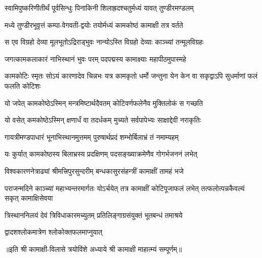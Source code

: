 

\twolineshloka
{स्वामिपुष्करिणीतीर्थं पूर्वसिन्धुः पिनाकिनी}
{शिलाह्रदश्चतुर्मध्यं यावत् तुण्डीरमण्डलम्}

\twolineshloka
{मध्ये तुण्डीरभूवृत्तं कम्पा-वेगवती-द्वयोः}
{तयोर्मध्यं कामकोष्ठं कामाक्षी तत्र वर्तते}

\twolineshloka
{स एव विग्रहो देव्या मूलभूतोऽद्रिराड्भुवः}
{नान्योऽस्ति विग्रहो देव्याः काञ्च्यां तन्मूलविग्रहः}

\twolineshloka
{जगत्कामकलाकारं नाभिस्थानं भुवः परम्}
{पदपद्मस्य कामाक्ष्याः महापीठमुपास्महे}

\threelineshloka
{कामकोटिः स्मृतः सोऽयं कारणादेव चिन्नभः}
{यत्र कामकृतो धर्मो जन्तुना येन केन वा}
{सकृद्वाऽपि सुधर्माणां फलं फलति कोटिशः}

\twolineshloka
{यो जपेत् कामकोष्ठेऽस्मिन् मन्त्रमिष्टार्थदैवतम्}
{कोटिवर्णफलेनैव मुक्तिलोकं स गच्छति}

\twolineshloka
{यो वसेत् कमकोष्ठेऽस्मिन् क्षणार्धं वा तदर्धकम्}
{मुच्यते सर्वपापेभ्यः साक्षाद्देवी नराकृतिः}

\twolineshloka
{गायत्रीमण्डपाधारं भूनाभिस्थानमुत्तमम्}
{पुरुषार्थप्रदं शम्भोर्बिलाभ्रं तं नमाम्यहम्}

\twolineshloka
{यः कुर्यात् कामकोष्ठस्य बिलाभ्रस्य प्रदक्षिणम्}
{पदसङ्ख्याक्रमेणैव गोगर्भजननं लभेत्}

\twolineshloka
{विश्वकारणनेत्राढ्यां श्रीमत्त्रिपुरसुन्दरीम्}
{बन्धकासुरसंहन्त्रीं कामाक्षीं तामहं भजे}

\threelineshloka
{पराजन्मदिने काञ्च्यां महाभ्यन्तरमार्गतः}
{योऽर्चयेत् तत्र कामाक्षीं कोटिपूजाफलं लभेत्}
{तत्फलोत्पन्नकैवल्यं सकृत् कामाक्षिसेवया}

\twolineshloka
{त्रिस्थाननिलयं देवं त्रिविधाकारमच्युतम्}
{प्रतिलिङ्गाग्रसंयुक्तं भूतबन्धं तमाश्रये}

{द्वादशश्लोकमात्रेण श्लोकोक्तफलमाप्नुयात्}

॥इति श्री कामाक्षी-विलासे त्रयोविंशे अध्याये श्री कामाक्षी माहात्म्यं सम्पूर्णम्॥